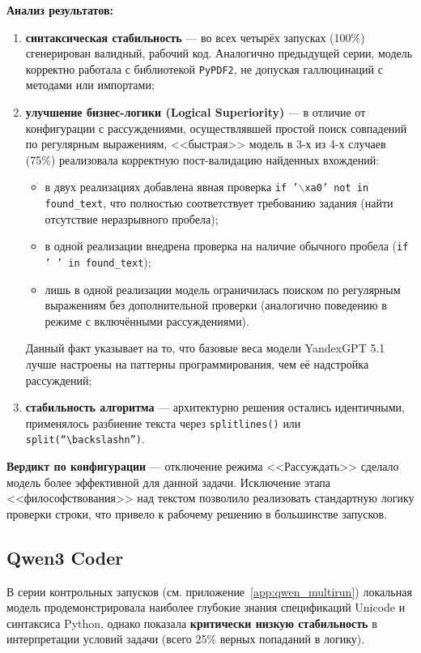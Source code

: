 \textbf{Анализ результатов:}
\begin{enumerate}
    \item \textbf{синтаксическая стабильность} --- во всех четырёх запусках (100\%) сгенерирован валидный, рабочий код. Аналогично предыдущей серии, модель корректно работала с библиотекой \texttt{PyPDF2}, не допуская галлюцинаций с методами или импортами;

    \item \textbf{улучшение бизнес-логики (Logical Superiority)} --- в отличие от конфигурации с рассуждениями, осуществлявшей простой поиск совпадений по регулярным выражениям, <<быстрая>> модель в 3-х из 4-х случаев (75\%) реализовала корректную пост-валидацию найденных вхождений:
    \begin{itemize}
        \item в двух реализациях добавлена явная проверка \texttt{if '$\backslash$xa0' not in found\_text}, что полностью соответствует требованию задания (найти отсутствие неразрывного пробела);
        \item в одной реализации внедрена проверка на наличие обычного пробела (\texttt{if ' ' in found\_text});
        \item лишь в одной реализации модель ограничилась поиском по регулярным выражениям без дополнительной проверки (аналогично поведению в режиме с включёнными рассуждениями).
    \end{itemize}
    Данный факт указывает на то, что базовые веса модели YandexGPT 5.1 лучше настроены на паттерны  программирования, чем её надстройка рассуждений;

    \item \textbf{стабильность алгоритма} --- архитектурно решения остались идентичными, применялось разбиение текста через \texttt{splitlines()} или \texttt{split(``$\backslash$n'')}.
\end{enumerate}

\textbf{Вердикт по конфигурации} --- отключение режима <<Рассуждать>> сделало модель более эффективной для данной задачи. Исключение этапа <<философствования>> над текстом позволило реализовать стандартную логику проверки строки, что привело к рабочему решению в большинстве запусков.

\subsection{Qwen3 Coder}

В серии контрольных запусков (см. приложение~\ref{app:qwen_multirun}) локальная модель продемонстрировала наиболее глубокие знания спецификаций Unicode и синтаксиса Python, однако показала \textbf{критически низкую стабильность} в интерпретации условий задачи (всего 25\% верных попаданий в логику).

